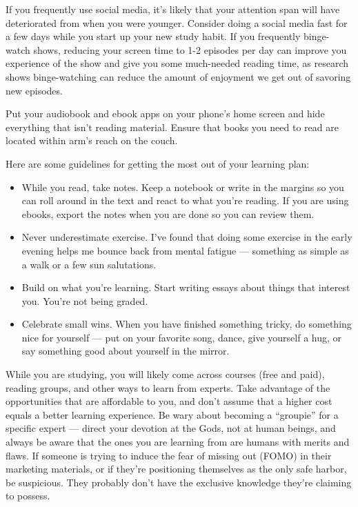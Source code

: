 \documentclass[
]{book}
\providecommand{\tightlist}{%
  \setlength{\itemsep}{0pt}\setlength{\parskip}{0pt}}
\begin{document}
If you frequently use social media, it's likely that your attention span will have deteriorated from when you were younger. Consider doing a social media fast for a few days while you start up your new study habit. If you frequently binge-watch shows, reducing your screen time to 1-2 episodes per day can improve you experience of the show and give you some much-needed reading time, as research shows binge-watching can reduce the amount of enjoyment we get out of savoring new episodes.

Put your audiobook and ebook apps on your phone's home screen and hide everything that isn't reading material. Ensure that books you need to read are located within arm's reach on the couch.

Here are some guidelines for getting the most out of your learning plan:

\begin{itemize}
\tightlist
\item
  While you read, take notes. Keep a notebook or write in the margins so you can roll around in the text and react to what you're reading. If you are using ebooks, export the notes when you are done so you can review them.
\item
  Never underestimate exercise. I've found that doing some exercise in the early evening helps me bounce back from mental fatigue --- something as simple as a walk or a few sun salutations.
\item
  Build on what you're learning. Start writing essays about things that interest you. You're not being graded.
\item
  Celebrate small wins. When you have finished something tricky, do something nice for yourself --- put on your favorite song, dance, give yourself a hug, or say something good about yourself in the mirror.
\end{itemize}

While you are studying, you will likely come across courses (free and paid), reading groups, and other ways to learn from experts. Take advantage of the opportunities that are affordable to you, and don't assume that a higher cost equals a better learning experience. Be wary about becoming a ``groupie'' for a specific expert --- direct your devotion at the Gods, not at human beings, and always be aware that the ones you are learning from are humans with merits and flaws. If someone is trying to induce the fear of missing out (FOMO) in their marketing materials, or if they're positioning themselves as the only safe harbor, be suspicious. They probably don't have the exclusive knowledge they're claiming to possess.
\end{document}
